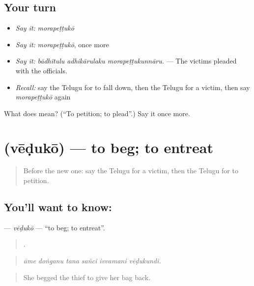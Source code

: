 \subsection*{Your turn}
\begin{itemize}
\raggedright
  \item \emph{Say it:} \emph{morapeṭṭukō}
  \item \emph{Say it:} \emph{morapeṭṭukō}, once more
  \item \emph{Say it:} \emph{bādhitulu adhikārulaku morapeṭṭukunnāru.} — The victims pleaded with the officials.
  \item \emph{Recall:} say the Telugu for to fall down, then the Telugu for a victim, then say \emph{morapeṭṭukō} again
\end{itemize}

\begin{tcolorbox}[breakable,colback=teal!4,colframe=teal!35!black,title={Before you move on}]
What does  mean? (\textquotedblleft{}To petition; to plead\textquotedblright{}.) Say it once more.
\end{tcolorbox}
\section[\texorpdfstring{\te{వేడుకో} (vēḍukō)}{వేడుకో (vēḍukō)}]{ (vēḍukō) — to beg; to entreat}

\label{lesson:TE-C379-veduko}



\begin{quote}
Before the new one: say the Telugu for a victim, then the Telugu for to petition.
\end{quote}

\subsection*{You'll want to know: }
\textbf{} — \emph{vēḍukō} — \textquotedblleft{}to beg; to entreat\textquotedblright{}.

\begin{quote}
     .
\end{quote}

\begin{quote}
\emph{āme doṅganu tana sañci ivvamani vēḍukundi.}
\end{quote}

\begin{quote}
She begged the thief to give her bag back.
\end{quote}

